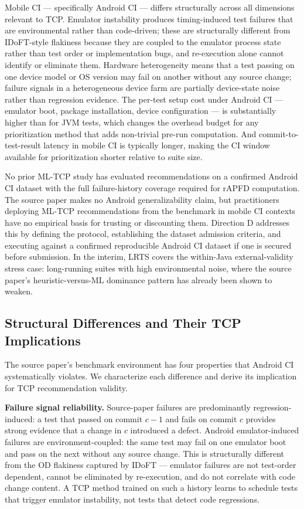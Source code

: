 \documentclass[conference]{IEEEtran}
\begin{document}
Mobile CI — specifically Android CI — differs structurally across all dimensions relevant to TCP. Emulator instability produces timing-induced test failures that are environmental rather than code-driven; these are structurally different from IDoFT-style flakiness because they are coupled to the emulator process state rather than test order or implementation bugs, and re-execution alone cannot identify or eliminate them. Hardware heterogeneity means that a test passing on one device model or OS version may fail on another without any source change; failure signals in a heterogeneous device farm are partially device-state noise rather than regression evidence. The per-test setup cost under Android CI — emulator boot, package installation, device configuration — is substantially higher than for JVM tests, which changes the overhead budget for any prioritization method that adds non-trivial pre-run computation. And commit-to-test-result latency in mobile CI is typically longer, making the CI window available for prioritization shorter relative to suite size.


No prior ML-TCP study has evaluated recommendations on a confirmed Android CI dataset with the full failure-history coverage required for rAPFD computation. The source paper makes no Android generalizability claim, but practitioners deploying ML-TCP recommendations from the benchmark in mobile CI contexts have no empirical basis for trusting or discounting them. Direction D addresses this by defining the protocol, establishing the dataset admission criteria, and executing against a confirmed reproducible Android CI dataset if one is secured before submission. In the interim, LRTS covers the within-Java external-validity stress case: long-running suites with high environmental noise, where the source paper's heuristic-versus-ML dominance pattern has already been shown to weaken.


\subsection{Structural Differences and Their TCP Implications}

The source paper's benchmark environment has four properties that Android CI systematically violates. We characterize each difference and derive its implication for TCP recommendation validity.

\textbf{Failure signal reliability.} Source-paper failures are predominantly regression-induced: a test that passed on commit $c-1$ and fails on commit $c$ provides strong evidence that a change in $c$ introduced a defect. Android emulator-induced failures are environment-coupled: the same test may fail on one emulator boot and pass on the next without any source change. This is structurally different from the OD flakiness captured by IDoFT — emulator failures are not test-order dependent, cannot be eliminated by re-execution, and do not correlate with code change content. A TCP method trained on such a history learns to schedule tests that trigger emulator instability, not tests that detect code regressions.
\end{document}
